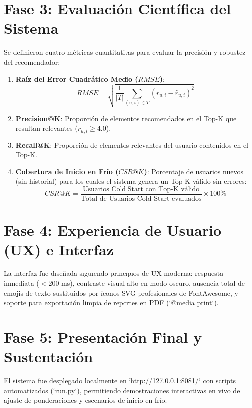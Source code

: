 \section{Fase 3: Evaluación Científica del Sistema}
Se definieron cuatro métricas cuantitativas para evaluar la precisión y robustez del recomendador:
\begin{enumerate}
    \item \textbf{Raíz del Error Cuadrático Medio ($RMSE$)}:
    \begin{equation}
    RMSE = \sqrt{\frac{1}{|T|} \sum_{(u,i) \in T} (r_{u,i} - \hat{r}_{u,i})^2}
    \end{equation}
    \item \textbf{Precision@K}: Proporción de elementos recomendados en el Top-K que resultan relevantes ($r_{u,i} \ge 4.0$).
    \item \textbf{Recall@K}: Proporción de elementos relevantes del usuario contenidos en el Top-K.
    \item \textbf{Cobertura de Inicio en Frío ($CSR@K$)}: Porcentaje de usuarios nuevos (sin historial) para los cuales el sistema genera un Top-K válido sin errores:
    \begin{equation}
    CSR@K = \frac{\text{Usuarios Cold Start con Top-K válido}}{\text{Total de Usuarios Cold Start evaluados}} \times 100\%
    \end{equation}
\end{enumerate}

\section{Fase 4: Experiencia de Usuario (UX) e Interfaz}
La interfaz fue diseñada siguiendo principios de UX moderna: respuesta inmediata ($<200$ ms), contraste visual alto en modo oscuro, ausencia total de emojis de texto sustituidos por íconos SVG profesionales de FontAwesome, y soporte para exportación limpia de reportes en PDF (`@media print`).

\section{Fase 5: Presentación Final y Sustentación}
El sistema fue desplegado localmente en `http://127.0.0.1:8081/` con scripts automatizados (`run.py`), permitiendo demostraciones interactivas en vivo de ajuste de ponderaciones y escenarios de inicio en frío.